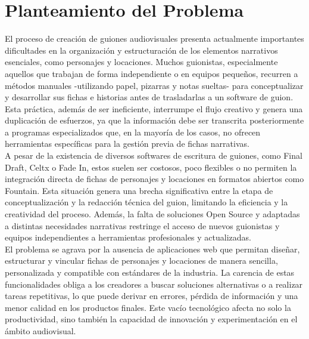 \documentclass[12pt]{article}
\begin{document}
	\newpage

	\section*{Planteamiento del Problema}

	El proceso de creación de guiones audiovisuales presenta actualmente importantes dificultades en la organización y estructuración de los elementos narrativos esenciales, como personajes y locaciones. Muchos guionistas, especialmente aquellos que trabajan de forma independiente o en equipos pequeños, recurren a métodos manuales -utilizando papel, pizarras y notas sueltas- para conceptualizar y desarrollar sus fichas e historias antes de trasladarlas a un software de guion. Esta práctica, además de ser ineficiente, interrumpe el flujo creativo y genera una duplicación de esfuerzos, ya que la información debe ser transcrita posteriormente a programas especializados que, en la mayoría de los casos, no ofrecen herramientas específicas para la gestión previa de fichas narrativas. \\

	A pesar de la existencia de diversos softwares de escritura de guiones, como Final Draft, Celtx o Fade In, estos suelen ser costosos, poco flexibles o no permiten la integración directa de fichas de personajes y locaciones en formatos abiertos como Fountain. Esta situación genera una brecha significativa entre la etapa de conceptualización y la redacción técnica del guion, limitando la eficiencia y la creatividad del proceso. Además, la falta de soluciones Open Source y adaptadas a distintas necesidades narrativas restringe el acceso de nuevos guionistas y equipos independientes a herramientas profesionales y actualizadas. \\

	El problema se agrava por la ausencia de aplicaciones web que permitan diseñar, estructurar y vincular fichas de personajes y locaciones de manera sencilla, personalizada y compatible con estándares de la industria. La carencia de estas funcionalidades obliga a los creadores a buscar soluciones alternativas o a realizar tareas repetitivas, lo que puede derivar en errores, pérdida de información y una menor calidad en los productos finales. Este vacío tecnológico afecta no solo la productividad, sino también la capacidad de innovación y experimentación en el ámbito audiovisual. \\
\end{document}
